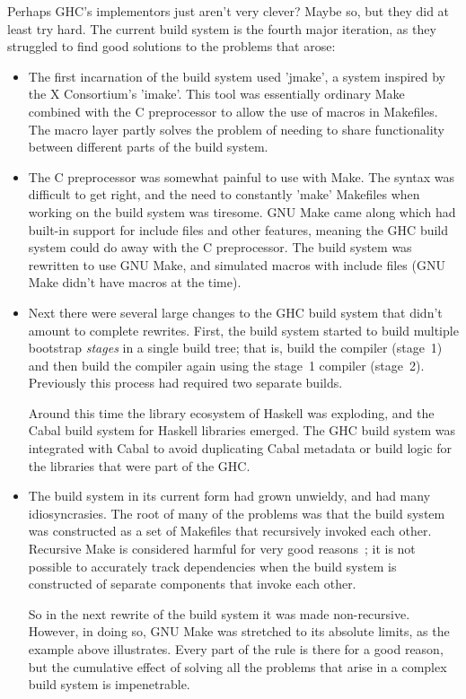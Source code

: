 Perhaps GHC's implementors just aren't very clever?  Maybe so, but
they did at least try hard. The current build system is the
fourth major iteration, as they struggled to find good solutions to the
problems that arose:

\begin{itemize}
\item The first incarnation of the build system used \lst'jmake', a
  system inspired by the X Consortium's \lst'imake'.  This tool was
  essentially ordinary Make combined with the C preprocessor to
  allow the use of macros in Makefiles.  The macro layer partly
  solves the problem of needing to share functionality between
  different parts of the build system.

\item The C preprocessor was somewhat painful to use with Make.
  The syntax was difficult to get right, and the need to constantly
  \lst'make' Makefiles when working on the build system was tiresome.  GNU
  Make came along which had built-in support for include files and
  other features, meaning the GHC build system could do away with the C
  preprocessor. The build system was rewritten to use GNU Make, and
  simulated macros with include files (GNU Make didn't have macros at
  the time).

\item Next there were several large changes to the GHC build system
  that didn't amount to complete rewrites.  First, the build system started
  to build multiple bootstrap \emph{stages} in a single build tree; that is,
  build the compiler (stage~1) and then build the compiler again using the
  stage~1 compiler (stage~2). Previously this process had required two separate builds.

  Around this time the library ecosystem of Haskell was exploding, and
  the Cabal build system for Haskell libraries emerged. The GHC build system was
  integrated with Cabal to avoid duplicating Cabal metadata or build logic for
  the libraries that were part of the GHC.

\item The build system in its current form had grown unwieldy, and had
  many idiosyncrasies. The root of many of the problems was that the
  build system was constructed as a set of Makefiles that recursively
  invoked each other. Recursive Make is considered harmful
  for very good reasons~\cite{miller:recursive_make}; it is not possible to
  accurately track dependencies when the build system is constructed
  of separate components that invoke each other.

  So in the next rewrite of the build system it was made non-recursive.
  However, in doing so, GNU Make was stretched to its absolute
  limits, as the example above illustrates. Every part of the rule is
  there for a good reason, but the cumulative effect of solving all
  the problems that arise in a complex build system is impenetrable.
\end{itemize}
